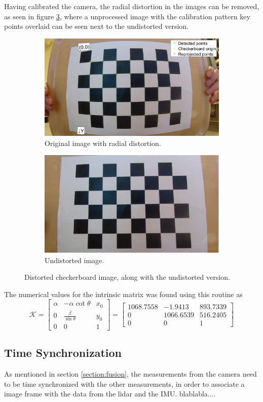 Having calibrated the camera, the radial distortion in the images can be removed, as seen in figure \ref{fig:distortion}, where a unprocessed image with the calibration pattern key points overlaid can be seen next to the undistorted version.
\begin{figure}[H]
	\centering
	\begin{subfigure}{.5\textwidth}
		\centering
		\includegraphics[width=.8\linewidth]{fig/calibration_distorted.PNG}
		\caption{Original image with radial distortion.}
		\label{fig:sub_distort1}
	\end{subfigure}%
	\begin{subfigure}{.5\textwidth}
		\centering
		\includegraphics[width=.8\linewidth]{fig/calibration_undistorted.PNG}
		\caption{Undistorted image.}
		\label{fig:sub_distort2}
	\end{subfigure}
	\caption{Distorted checkerboard image, along with the undistorted version.}
	\label{fig:distortion}
\end{figure}
The numerical values for the intrinsic matrix was found using this routine as
\begin{equation}
\mathcal{K}=\begin{bmatrix}\alpha & -\alpha\cot{\theta} & x_0\\0 & \frac{\beta}{\sin{\theta}} & y_0\\0 & 0 & 1\end{bmatrix}=\begin{bmatrix}
1068.7558 & -1.9413 & 893.7339 \\ 0 & 1066.6539 &516.2405\\ 0 & 0 & 1
\end{bmatrix}
\end{equation}  
\subsection{Time Synchronization}
As mentioned in section \ref{section:fusion}, the measurements from the camera need to be time synchronized with the other measurements, in order to associate a image frame with the data from the lidar and the IMU. blablabla....
\cleardoublepage